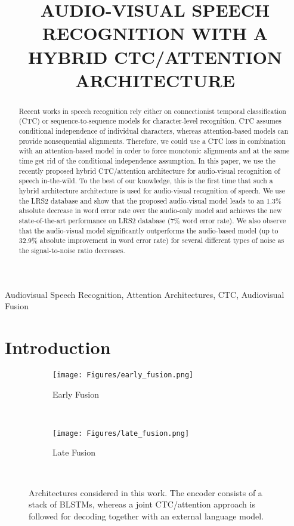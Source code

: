 \documentclass{article}
\title{AUDIO-VISUAL SPEECH RECOGNITION WITH A HYBRID CTC/ATTENTION ARCHITECTURE}
\begin{document}
\maketitle
\begin{abstract}
Recent works in speech recognition rely either on connectionist temporal classification (CTC) or sequence-to-sequence models for character-level recognition. CTC assumes conditional independence of individual characters, whereas attention-based models can provide nonsequential alignments. Therefore, we could use a CTC loss in combination with an attention-based model in order to force monotonic alignments and at the same time get rid of the conditional independence assumption. In this paper, we use the recently proposed hybrid CTC/attention architecture for audio-visual recognition of speech in-the-wild. To the best of our knowledge, this is the first time that such a hybrid architecture architecture is used for audio-visual recognition of speech. We use the LRS2 database and show that the proposed audio-visual model leads to an 1.3\% absolute decrease in word error rate over the audio-only model and achieves the new state-of-the-art performance on LRS2 database (7\% word error rate). We also observe that the audio-visual model significantly outperforms the audio-based model (up to 32.9\% absolute improvement in word error rate)  for several different types of noise as the signal-to-noise ratio decreases.


\end{abstract}
\begin{keywords}
Audiovisual Speech Recognition, Attention Architectures, CTC, Audiovisual Fusion
\end{keywords}
\section{Introduction}
\label{sec:intro}

\begin{figure*}
    \centering
    \begin{subfigure}[b]{0.35\textwidth}
        \texttt{[image: Figures/early\_fusion.png]}
        \caption{Early Fusion}
        \label{fig:earlyFusion}
    \end{subfigure}
    ~ \begin{subfigure}[b]{0.48\textwidth}
        \texttt{[image: Figures/late\_fusion.png]}
        \caption{Late Fusion}
        \label{fig:lateFusion}
    \end{subfigure}
    ~ \caption{Architectures considered in this work. The encoder  consists of a stack of BLSTMs, whereas a joint CTC/attention approach is followed for decoding together with an external language model.}\label{fig:archit}
\end{figure*}
\end{document}
